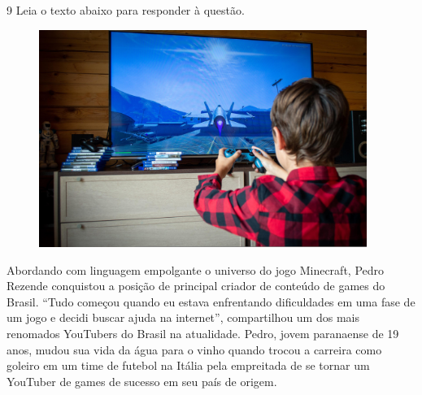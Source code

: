 \num{9} Leia o texto abaixo para responder à questão. 

\begin{myquote}

\begin{figure}[H]
\centering
\includegraphics[width=0.95\textwidth]{./imgSAEB_7_POR/media/image68.png}
\end{figure} 
Abordando com linguagem empolgante o universo do jogo Minecraft, Pedro Rezende
conquistou a posição de principal criador de conteúdo de games do Brasil.
``Tudo começou quando eu estava enfrentando dificuldades em uma fase de um
jogo e decidi buscar ajuda na internet'', compartilhou um dos mais renomados
YouTubers do Brasil na atualidade. Pedro, jovem paranaense de 19 anos, mudou
sua vida da água para o vinho quando trocou a carreira como goleiro em um time
de futebol na Itália pela empreitada de se tornar um YouTuber de games de
sucesso em seu país de origem.


\end{myquote}


